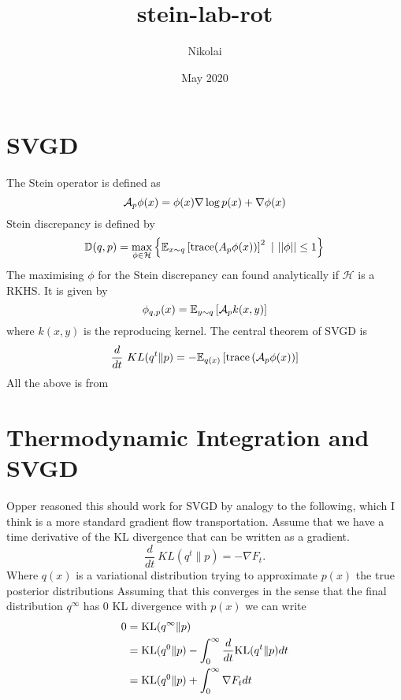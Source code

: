 \documentclass{article}
\title{stein-lab-rot}
\author{Nikolai }
\date{May 2020}
\begin{document}
\maketitle

\section{SVGD}
The Stein operator is defined as
\begin{equation}
    \label{eq:stein_operator}
    \mathcal{A}_p \phi(x) = \phi(x) \nabla \log p(x) + \nabla \phi(x)
\end{equation}
Stein discrepancy is defined by
\begin{equation}
    \label{eq:stein_discrepancy}
    \mathbb{D}( q, p ) = \max_{ \phi \in \mathcal{H} } 
    \left\{ 
        \mathbb{E}_{ x \sim q } 
        \left[ 
            \textrm{trace} ( A_p \phi(x) ) 
        \right]^2
        \ | \ ||\phi|| \leq 1 
    \right\}
\end{equation}
The maximising $\phi$ for the Stein discrepancy can found analytically if $\mathcal{H}$ is a RKHS. It is given by
\begin{equation}
    \label{eq:phi_max}
    \phi_{ q, p } (x) = \mathbb{E}_{ y \sim q } \left[ \mathcal{A}_p k(x, y) \right]
\end{equation}
where $k(x,y)$ is the reproducing kernel.
The central theorem of SVGD is
\begin{equation}
    \label{eq:svgd}
    \frac{d}{dt}\ KL( q^t \| p ) = - \mathbb{E}_{q(x)} \left[ \textrm{trace} \left( \mathcal{A}_p \phi(x) \right) \right]
\end{equation}
All the above is from \cite{svgd}


\section{Thermodynamic Integration and SVGD}
Opper reasoned this should work for SVGD by analogy to the following, which I think is a more standard gradient
flow transportation. Assume that we have a time derivative of the KL divergence that can be written as a gradient.
\begin{equation}
    \frac{d}{dt}\ KL( q^t \| p ) = - \nabla F_t.
\end{equation}
Where $q(x)$ is a variational distribution trying to approximate $p(x)$ the true posterior distributions
Assuming that this converges in the sense that the final distribution $q^{\infty}$ has 0 KL divergence with 
$p(x)$ we can write
\begin{align}
\label{eq:therm_int}
0 &= \textrm{KL}( q^{\infty} \| p ) \\
&= \textrm{KL}( q^0 \| p ) - \int_0^{\infty} \frac{d}{dt} \textrm{KL}( q^t \| p ) dt \\
&= \textrm{KL}( q^0 \| p ) + \int_0^{\infty} \nabla F_t dt
\end{align}
\end{document}
